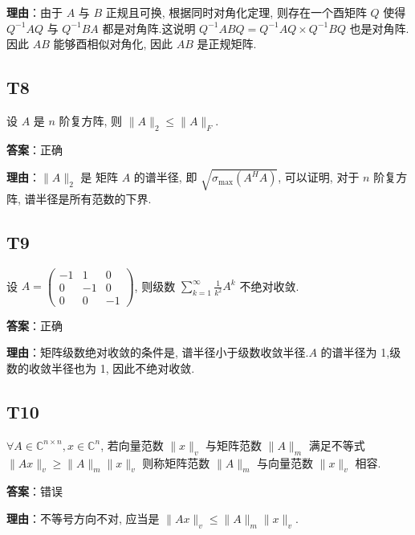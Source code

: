 \documentclass{article}
\begin{document}
\par \textbf{理由}：由于 $A$ 与 $B$ 正规且可换, 根据同时对角化定理, 则存在一个酉矩阵 $Q$ 使得 $Q^{-1}AQ$ 与 $Q^{-1}BA$ 都是对角阵.这说明 $Q^{-1}ABQ = Q^{-1}AQ\times Q^{-1}BQ$ 也是对角阵.因此 $AB$ 能够酉相似对角化, 因此 $AB$ 是正规矩阵.

\subsection{T8}

\par 设 $A$ 是 $n$ 阶复方阵, 则 $\|A\|_2\leq \|A\|_F$.

\par \textbf{答案}：正确

\par \textbf{理由}：$\|A\|_2$ 是 矩阵 $A$ 的谱半径, 即 $\sqrt{\sigma_{\text{max}}(A^HA)}$, 可以证明, 对于 $n$ 阶复方阵, 谱半径是所有范数的下界.

\subsection{T9}

\par 设 $A=\begin{pmatrix}-1 & 1 & 0\\0 & -1 & 0\\0 & 0 &-1\end{pmatrix}$, 则级数 $\sum_{k=1}^{\infty}\frac{1}{k^2}A^k$ 不绝对收敛.

\par \textbf{答案}：正确

\par \textbf{理由}：矩阵级数绝对收敛的条件是, 谱半径小于级数收敛半径.$A$ 的谱半径为 1,级数的收敛半径也为 1, 因此不绝对收敛.

\subsection{T10}

\par $\forall A\in \mathbb C^{n\times n}, x\in \mathbb C^n$, 若向量范数 $\|x\|_v$ 与矩阵范数 $\|A\|_m$ 满足不等式 $\|Ax\|_v\geq \|A\|_m \|x\|_v$ 则称矩阵范数 $\|A\|_m$ 与向量范数 $\|x\|_v$ 相容.

\par \textbf{答案}：错误

\par \textbf{理由}：不等号方向不对, 应当是 $\|Ax\|_v\leq \|A\|_m \|x\|_v$.
\end{document}
